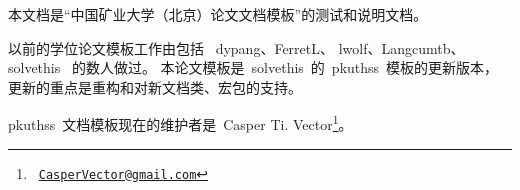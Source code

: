 
本文档是“中国矿业大学（北京）论文文档模板”的测试和说明文档。

以前的学位论文模板工作由包括~%
dypang\supercite{dypang}、FerretL\supercite{FerretL}、
lwolf\supercite{lwolf}、Langcumtb\supercite{Langcumtb}、
solvethis\supercite{solvethis}~%
的数人做过。
本论文模板是~solvethis~的~pkuthss~模板的更新版本，
更新的重点是重构和对新文档类、宏包的支持。

pkuthss~文档模板现在的维护者是~Casper Ti. Vector\footnote%
{\ \href{CasperVector@gmail.com}{\texttt{CasperVector@gmail.com}}}。

